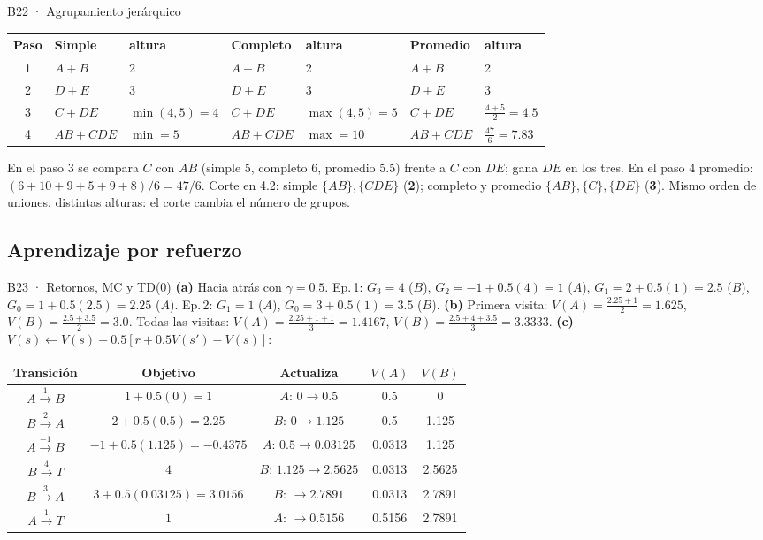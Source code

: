 \begin{solucion}{B22 · Agrupamiento jerárquico}
\begin{center}\small
\begin{tabular}{c|ll|ll|ll}
\toprule
Paso & Simple & altura & Completo & altura & Promedio & altura\\\midrule
1 & $A+B$ & 2 & $A+B$ & 2 & $A+B$ & 2\\
2 & $D+E$ & 3 & $D+E$ & 3 & $D+E$ & 3\\
3 & $C+DE$ & $\min(4,5)=4$ & $C+DE$ & $\max(4,5)=5$ & $C+DE$ & $\frac{4+5}2=4.5$\\
4 & $AB+CDE$ & $\min=5$ & $AB+CDE$ & $\max=10$ & $AB+CDE$ & $\frac{47}6=7.83$\\\bottomrule
\end{tabular}
\end{center}
En el paso 3 se compara $C$ con $AB$ (simple 5, completo 6, promedio 5.5) frente a $C$ con $DE$; gana $DE$ en los tres.
En el paso 4 promedio: $(6+10+9+5+9+8)/6=47/6$. Corte en 4.2: simple $\{AB\},\{CDE\}$ (\textbf{2}); completo y promedio $\{AB\},\{C\},\{DE\}$ (\textbf{3}).
Mismo orden de uniones, distintas alturas: el corte cambia el número de grupos.
\end{solucion}

\subsection{Aprendizaje por refuerzo}

\begin{solucion}{B23 · Retornos, MC y TD(0)}
\textbf{(a)} Hacia atrás con $\gamma=0.5$. Ep.\,1: $G_3=4$ ($B$), $G_2=-1+0.5(4)=1$ ($A$), $G_1=2+0.5(1)=2.5$ ($B$), $G_0=1+0.5(2.5)=2.25$ ($A$).
Ep.\,2: $G_1=1$ ($A$), $G_0=3+0.5(1)=3.5$ ($B$).
\textbf{(b)} Primera visita: $V(A)=\frac{2.25+1}{2}=\mathbf{1.625}$, $V(B)=\frac{2.5+3.5}2=\mathbf{3.0}$.
Todas las visitas: $V(A)=\frac{2.25+1+1}3=\mathbf{1.4167}$, $V(B)=\frac{2.5+4+3.5}3=\mathbf{3.3333}$.
\textbf{(c)} $V(s)\leftarrow V(s)+0.5[r+0.5V(s')-V(s)]$:
\begin{center}\small
\begin{tabular}{c|c|c|cc}
Transición & Objetivo & Actualiza & $V(A)$ & $V(B)$\\\hline
$A\xrightarrow{1}B$ & $1+0.5(0)=1$ & $A$: $0\to0.5$ & 0.5 & 0\\
$B\xrightarrow{2}A$ & $2+0.5(0.5)=2.25$ & $B$: $0\to1.125$ & 0.5 & 1.125\\
$A\xrightarrow{-1}B$ & $-1+0.5(1.125)=-0.4375$ & $A$: $0.5\to0.03125$ & 0.0313 & 1.125\\
$B\xrightarrow{4}T$ & $4$ & $B$: $1.125\to2.5625$ & 0.0313 & 2.5625\\
$B\xrightarrow{3}A$ & $3+0.5(0.03125)=3.0156$ & $B$: $\to2.7891$ & 0.0313 & 2.7891\\
$A\xrightarrow{1}T$ & $1$ & $A$: $\to0.5156$ & 0.5156 & 2.7891
\end{tabular}
\end{center}
\end{solucion}

